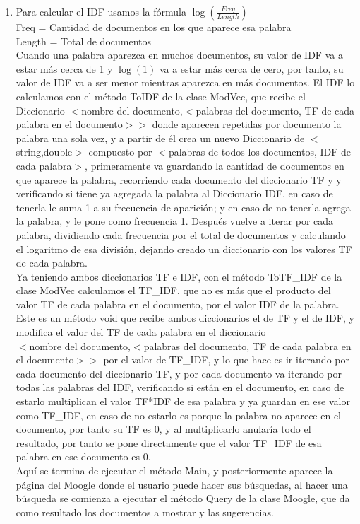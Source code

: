 \documentclass[12pt, a4paper]{article}
\begin{document}
\begin{enumerate}
      \item Para calcular el IDF usamos la fórmula $\log(\frac{Freq}{Length})$\\
            Freq = Cantidad de documentos en los que aparece esa palabra\\
            Length = Total de documentos\\
            Cuando una palabra aparezca en muchos documentos, su valor de IDF va a estar más
            cerca de 1 y $\log(1)$ va a estar más cerca de cero, por tanto, su valor de IDF va a
            ser menor mientras aparezca en más documentos.
            El IDF lo calculamos con el método ToIDF de la clase ModVec, que recibe
            el Diccionario
            $<$nombre del documento,$<$palabras del documento, TF de cada palabra en el documento$>>$
            donde aparecen repetidas por documento la palabra una sola vez, y a partir de él
            crea un nuevo Diccionario de $<$string,double$>$ compuesto por
            $<$palabras de todos los documentos, IDF de cada palabra$>$, primeramente va guardando
            la cantidad de documentos en que aparece la palabra, recorriendo cada documento
            del diccionario TF y y verificando si tiene ya agregada la palabra al
            Diccionario IDF, en caso de tenerla le suma 1 a su frecuencia de aparición;
            y en caso de no tenerla agrega la palabra, y le pone como frecuencia 1.
            Después vuelve a iterar por cada palabra, dividiendo cada frecuencia por el total
            de documentos y calculando el logaritmo de esa división, dejando creado un
            diccionario con los valores TF de cada palabra.\\
            Ya teniendo ambos diccionarios TF e IDF, con el método ToTF\_IDF de la clase ModVec
            calculamos el TF\_IDF, que no es más que el producto del valor TF de cada palabra
            en el documento, por el valor IDF de la palabra. Este es un método void que
            recibe ambos diccionarios el de TF y el de IDF, y modifica el valor del TF de cada
            palabra en el diccionario\\
            $<$nombre del documento,$<$palabras del documento, TF de cada palabra en el documento$>>$
            por el valor de TF\_IDF, y lo que hace es ir iterando por cada documento del
            diccionario TF, y por cada documento
            va iterando por todas las palabras del IDF, verificando si están en el documento,
            en caso de estarlo multiplican el valor TF*IDF de esa palabra y ya guardan en ese
            valor como TF\_IDF, en caso de no estarlo es porque la palabra no aparece en el documento,
            por tanto su TF es 0, y al multiplicarlo anularía todo el resultado, por tanto se
            pone directamente que el valor TF\_IDF de esa palabra en ese documento es 0.\\
            Aquí se termina de ejecutar el método Main, y posteriormente aparece la página del Moogle
            donde el usuario puede hacer sus búsquedas, al hacer una búsqueda se comienza a ejecutar
            el método Query de la clase Moogle, que da como resultado los documentos a mostrar y
            las sugerencias.


\end{enumerate}
\end{document}
